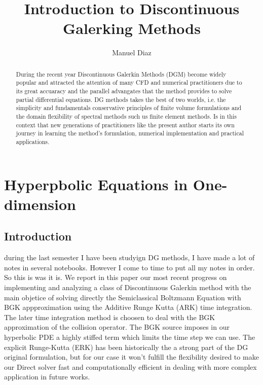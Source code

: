 \documentclass[11pt,fleqn]{report}
\begin{document}
\title{Introduction to Discontinuous Galerking Methods}
\author{Manuel Diaz}
\maketitle

\tableofcontents 

\begin{abstract}
During the recent year Discontinuous Galerkin Methods (DGM) become widely popular and attracted the attention of many CFD and numerical practitioners due to its great accuaracy and the parallel advangates that the method provides to solve partial differential equations. DG methods takes the best of two worlds, i.e. the simplicity and fundamentals conservative principles of finite volume formulations and the domain flexibility of spectral methods such us finite element methods. Is in this context that new generations of practitioners like the present author starts its own journey in learning the method's formulation, numerical implementation and practical applications. 
\end{abstract}

\chapter{Hyperpbolic Equations in One-dimension}

\section{Introduction}
during the last semester I have been studyign DG methods, I have made a lot of notes in several notebooks. However I come to time to put all my notes in order. So this is was it is.
We report in this paper our most recent progress on implementing and analyzing a class of Discontinuous Galerkin method with the main objetice of solving directly the Semiclassical Boltzmann Equation with BGK appproximation using the Additive Runge Kutta (ARK) time integration. The later time integration method is choosen to deal with the BGK approximation of the collision operator. The BGK source imposes in our hyperbolic PDE a highly stiffed term which limits the time step we can use. The explicit Runge-Kutta (ERK) has been historically the a strong part of the DG original formulation, but for our case it won't fulfill the flexibility desired to make our Direct solver fast and computationally efficient in dealing with more complex application in future works.
\end{document}
